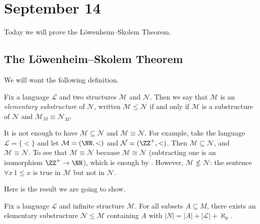\documentclass[../notes.tex]{subfiles}
\begin{document}
\section{September 14}

Today we will prove the L\"owenheim--Skolem Theorem.

\subsection{The L\"owenheim--Skolem Theorem}
We will want the following definition.
\begin{definition}
	Fix a language $\mathcal L$ and two structures $\mathcal M$ and $\mathcal N$. Then we say that $\mathcal M$ is an \textit{elementary substructure} of $\mathcal N$, written $\mathcal M\le\mathcal N$ if and only if $\mathcal M$ is a substructure of $\mathcal N$ and $\mathcal M_M\equiv\mathcal N_M$.
\end{definition}
\begin{remark}
	It is not enough to have $\mathcal M\subseteq\mathcal N$ and $\mathcal M\equiv\mathcal N$. For example, take the language $\mathcal L=\{<\}$ and let $\mathcal M=(\NN,<)$ and $\mathcal N=(\ZZ^+,<)$. Then $\mathcal M\subseteq\mathcal N$, and $\mathcal M\equiv\mathcal N$. To see that $\mathcal M\equiv\mathcal N$ because $\mathcal M\cong\mathcal N$ (subtracting one is an isomorphism $\ZZ^+\to\NN$), which is enough by . However, $\mathcal M\not\le\mathcal N$: the sentence $\forall x\,1\le x$ is true in $\mathcal M$ but not in $\mathcal N$.
\end{remark}
Here is the result we are going to show.
\begin{theorem} \label{thm:down-skolem}
	Fix a language $\mathcal L$ and infinite structure $\mathcal M$. For all subsets $A\subseteq M$, there exists an elementary substructure $\mathcal N\le\mathcal M$ containing $A$ with $\left|N\right|=\left|A\right|+\left|\mathcal L\right|+\aleph_0$.
\end{theorem}
\end{document}
